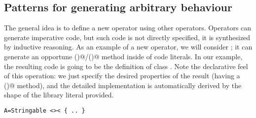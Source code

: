 %
%
%
%










\subsection*{Patterns for generating arbitrary behaviour}
The general idea is to define a new operator
using other operators.
Operators can generate imperative code, but such code is not directly
specified, it is synthesized by inductive reasoning.
As an example of a new operator, we will
consider \Q@Stringable@;
it can generate an opportune \Q@toS()@/\Q@toString()@ method inside of code literals.
In our example, the resulting code is going to be the definition
of class \Q@A@.
Note the declarative feel of this operation: we just specify the desired properties of the result (having a \Q@toS()@ method), and the detailed implementation is  
 automatically derived by the shape of the library literal provided.

\saveSpace
\begin{lstlisting}
A=Stringable <>< { .. }
\end{lstlisting}
\saveSpace

